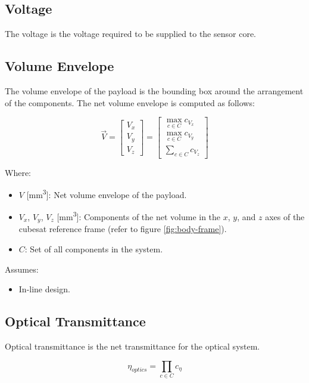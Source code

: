 \documentclass{article}
\begin{document}
\subsection{Voltage}
The voltage is the voltage required to be supplied to the sensor core.

\subsection{Volume Envelope}
The volume envelope of the payload is the bounding box around the arrangement of the components. The net volume envelope is computed as follows:

\begin{equation}
\vec{V} = \begin{bmatrix} V_x\\ V_y\\ V_z \end{bmatrix} = \begin{bmatrix} \max_{c \in C} c_{V_x}\\ \max_{c \in C} c_{V_y}\\ \sum_{c \in C} c_{V_z} \end{bmatrix}
\end{equation}

Where:
\begin{itemize}[label={}]
    \item $V$ [\si{\cubic\mm}]: Net volume envelope of the payload.
    \item $V_x$, $V_y$, $V_z$ [\si{\cubic\mm}]: Components of the net volume in the $x$, $y$, and $z$ axes of the cubesat reference frame (refer to figure \ref{fig:body-frame}).
    \item $C$: Set of all components in the system.
\end{itemize}

Assumes:
\begin{itemize}
    \item In-line design. 
\end{itemize}

\subsection{Optical Transmittance}
Optical transmittance is the net transmittance for the optical system.

\begin{equation}
    \eta_{optics} = \prod_{c \in C} c_{\eta}
\end{equation}
\end{document}
